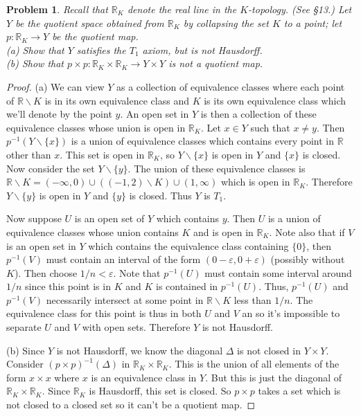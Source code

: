 \documentclass{article}
\newtheorem{problem}{Problem}
\begin{document}
\begin{problem}
Recall that $\mathbb{R}_K$ denote the real line in the $K$-topology. (See \S 13.) Let $Y$ be the quotient space obtained from $\mathbb{R}_K$ by collapsing the set $K$ to a point; let $p : \mathbb{R}_K \to Y$ be the quotient map.\\
(a) Show that $Y$ satisfies the $T_1$ axiom, but is not Hausdorff.\\
(b) Show that $p \times p : \mathbb{R}_K \times \mathbb{R}_K \to Y \times Y$ is not a quotient map.
\end{problem}
\begin{proof}
(a) We can view $Y$ as a collection of equivalence classes where each point of $\mathbb{R} \backslash K$ is in its own equivalence class and $K$ is its own equivalence class which we'll denote by the point $y$. An open set in $Y$ is then a collection of these equivalence classes whose union is open in $\mathbb{R}_K$. Let $x \in Y$ such that $x \neq y$. Then $p^{-1}(Y \backslash \{x\})$ is a union of equivalence classes which contains every point in $\mathbb{R}$ other than $x$. This set is open in $\mathbb{R}_K$, so $Y \backslash \{x\}$ is open in $Y$ and $\{x\}$ is closed. Now consider the set $Y \backslash \{y\}$. The union of these equivalence classes is $\mathbb{R} \backslash K = (-\infty, 0) \cup ((-1,2) \backslash K) \cup (1, \infty)$ which is open in $\mathbb{R}_K$. Therefore $Y \backslash \{y\}$ is open in $Y$ and $\{y\}$ is closed. Thus $Y$ is $T_1$.

Now suppose $U$ is an open set of $Y$ which contains $y$. Then $U$ is a union of equivalence classes whose union contains $K$ and is open in $\mathbb{R}_K$. Note also that if $V$ is an open set in $Y$ which contains the equivalence class containing $\{0\}$, then $p^{-1}(V)$ must contain an interval of the form $(0 - \varepsilon, 0 + \varepsilon)$ (possibly without $K$). Then choose $1/n < \varepsilon$. Note that $p^{-1}(U)$ must contain some interval around $1/n$ since this point is in $K$ and $K$ is contained in $p^{-1}(U)$. Thus, $p^{-1}(U)$ and $p^{-1}(V)$ necessarily intersect at some point in $\mathbb{R} \backslash K$ less than $1/n$. The equivalence class for this point is thus in both $U$ and $V$ an so it's impossible to separate $U$ and $V$ with open sets. Therefore $Y$ is not Hausdorff.

(b) Since $Y$ is not Hausdorff, we know the diagonal $\Delta$ is not closed in $Y \times Y$. Consider $(p \times p)^{-1}(\Delta)$ in $\mathbb{R}_K \times \mathbb{R}_K$. This is the union of all elements of the form $x \times x$ where $x$ is an equivalence class in $Y$. But this is just the diagonal of $\mathbb{R}_K \times \mathbb{R}_K$. Since $\mathbb{R}_K$ is Hausdorff, this set is closed. So $p \times p$ takes a set which is not closed to a closed set so it can't be a quotient map.
\end{proof}
\end{document}
